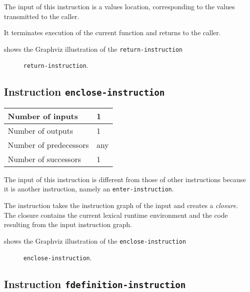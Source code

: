 The input of this instruction is a values location, corresponding to
the values transmitted to the caller.

It terminates execution of the current function and returns to the
caller. 

 shows the Graphviz illustration of the
\texttt{return-instruction}

\begin{figure}
\begin{center}
\end{center}
\caption{\label{fig-return-instruction}
\texttt{return-instruction}.}
\end{figure}

\subsection{Instruction \texttt{enclose-instruction}}
\label{mir-instruction-enclose}

\begin{tabular}{|l|l|}
\hline
Number of inputs & 1\\
\hline
Number of outputs & 1\\
\hline
Number of predecessors & any\\
\hline
Number of successors & 1\\
\hline
\end{tabular}

The input of this instruction is different from those of other
instructions because it is another instruction, namely an
\texttt{enter-instruction}.

The instruction takes the instruction graph of the input and creates a
\emph{closure}.  The closure contains the current lexical runtime
environment and the code resulting from the input instruction graph.

 shows the Graphviz illustration of the
\texttt{enclose-instruction}

\begin{figure}
\begin{center}
\end{center}
\caption{\label{fig-enclose-instruction}
\texttt{enclose-instruction}.}
\end{figure}

\subsection{Instruction \texttt{fdefinition-instruction}}
\label{mir-instruction-fdefinition}

